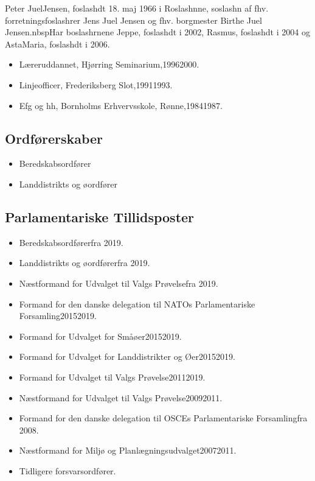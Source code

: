 \documentclass[11pt, a4paper]{awesome-cv}
\begin{document}
\makecvheader[R]
\makelettertitle
\begin{cvletter}
Peter JuelJensen, foslashdt 18. maj 1966 i Roslashnne, soslashn af fhv. forretningsfoslashrer Jens Juel Jensen og fhv. borgmester Birthe Juel Jensen.nbspHar boslashrnene Jeppe, foslashdt i 2002, Rasmus, foslashdt i 2004 og AstaMaria, foslashdt i 2006.

\begin{itemize}
\item Læreruddannet, Hjørring Seminarium,19962000.
\item Linjeofficer, Frederiksberg Slot,19911993.
\item Efg og hh, Bornholms Erhvervsskole, Rønne,19841987.
\end{itemize}
\subsection*{Ordførerskaber}
\begin{itemize}
\item Beredskabsordfører
\item Landdistrikts og øordfører
\end{itemize}
\subsection*{Parlamentariske Tillidsposter}
\begin{itemize}
\item Beredskabsordførerfra 2019.
\item Landdistrikts og øordførerfra 2019.
\item Næstformand for Udvalget til Valgs Prøvelsefra 2019.
\item Formand for den danske delegation til NATOs Parlamentariske Forsamling20152019.
\item Formand for Udvalget for Småøer20152019.
\item Formand for Udvalget for Landdistrikter og Øer20152019.
\item Formand for Udvalget til Valgs Prøvelse20112019.
\item Næstformand for Udvalget til Valgs Prøvelse20092011.
\item Formand for den danske delegation til OSCEs Parlamentariske Forsamlingfra 2008.
\item Næstformand for Miljø og Planlægningsudvalget20072011.
\item Tidligere forsvarsordfører.
\end{itemize}

\end{cvletter}
\end{document}
